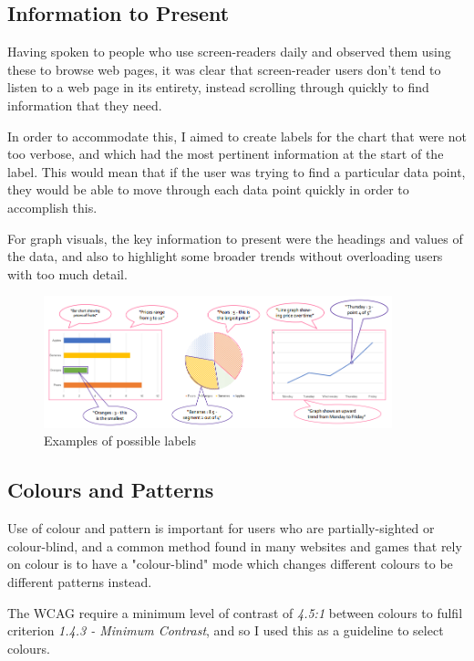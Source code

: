 \documentclass[ %
                    author={Aleena Baig},
                supervisor={Dr Simon Lock},
                    degree={BSc},
                     title={On Making Web Accessible Graphs},
                  subtitle={},
                      year={2019} ]{dissertation}
\begin{document}
\subsection{Information to Present}

Having spoken to people who use screen-readers daily and observed them using these to browse web pages, it was clear that screen-reader users don't tend to listen to a web page in its entirety, instead scrolling through quickly to find information that they need.

In order to accommodate this, I aimed to create labels for the chart that were not too verbose, and which had the most pertinent information at the start of the label. This would mean that if the user was trying to find a particular data point, they would be able to move through each data point quickly in order to accomplish this.

For graph visuals, the key information to present were the headings and values of the data, and also to highlight some broader trends without overloading users with too much detail.

\begin{figure}[h]
\centering
\includegraphics[width=0.9\textwidth]{images/GraphDesignWithReadouts.PNG}
\caption{Examples of possible labels}
\end{figure}

\subsection{Colours and Patterns}

Use of colour and pattern is important for users who are partially-sighted or colour-blind, and a common method found in many websites and games that rely on colour is to have a "colour-blind" mode which changes different colours to be different patterns instead.

The WCAG require a minimum level of contrast of \textit{4.5:1} between colours to fulfil criterion \textit{1.4.3 - Minimum Contrast}, and so I used this as a guideline to select colours.
\end{document}

